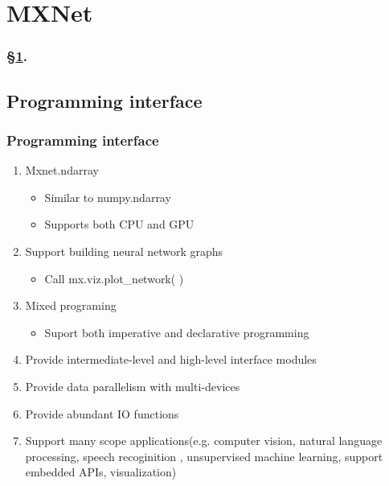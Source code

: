 
\section{MXNet}\label{sec:MxNet}


\frameinlbffalse

\begin{frame}[plain]
\frametitle{\S\ref{sec:MxNet}. \insertsection}
\listofframes
\end{frame}
\addtocounter{framenumber}{-1} %

\frameinlbftrue

\subsection{Programming interface}

\begin{frame}
  \MyLogo
  \frametitle{Programming interface}  

\begin{enumerate}
\item Mxnet.ndarray 
\begin{itemize}
\item Similar to numpy.ndarray
\item Supports both CPU and GPU
\end{itemize}

\item Support building neural network graphs
\begin{itemize}
\item Call mx.viz.plot\_network( )
\end{itemize}

\item Mixed programing
\begin{itemize}
\item Suport both imperative and declarative programming 
\end{itemize}
\item Provide intermediate-level and high-level interface modules

\item Provide data parallelism with multi-devices 
%
\item Provide abundant IO functions 
%
\item Support many scope applications(e.g. computer vision, natural language processing,  speech recoginition , unsupervised machine learning, support embedded APIs, visualization)

\end{enumerate}

\end{frame}

